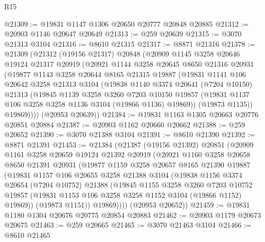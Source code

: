 \begin{lexlean}{R15}
\begin{coremodule}
@21309 := @19831 @1147 @1306 @20650 @20777 @20848 @20885
@21312 := @20903 @1146 @20647 @20649
@21313 := @259 @20639
@21315 := @3070 @21313 @3104
@21316 := @8610 @21315
@21317 := @8871 @21316
@21378 := @21309
    (@21312
      (@19156 @21317)
      @20848
      (@20909
        @1145
        @3258
        @20646
        @19124
        @21317
        @20919
        (@20921
          @1144
          @3258
          @20645
          @8650
          @21316
          @20931
          (@19877
            @1143
            @3258
            @20644
            @8165
            @21315
            @19887
            (@19831
              @1141
              @106
              @20642
              @3258
              @21313
              @3104
              (@19838
                @1140
                @3374
                @20641
                (@7204 @10150)
                @21313
                (@19845
                  @1139
                  @3258
                  @3260
                  @7203
                  @10150
                  @19857
                  (@19831 @1137 @106 @3258 @3258 @1136 @3104 (@19866 @1136) @19869))
                (@19873 @1135))
              @19869))))
      (@20953 @20639))
@21384 := @19831 @1163 @1305 @20663 @20776 @20851 @20884
@21387 := @20903 @1162 @20660 @20662
@21388 := @259 @20652
@21390 := @3070 @21388 @3104
@21391 := @8610 @21390
@21392 := @8871 @21391
@21453 := @21384
    (@21387
      (@19156 @21392)
      @20851
      (@20909
        @1161
        @3258
        @20659
        @19124
        @21392
        @20919
        (@20921
          @1160
          @3258
          @20658
          @8650
          @21391
          @20931
          (@19877
            @1159
            @3258
            @20657
            @8165
            @21390
            @19887
            (@19831
              @1157
              @106
              @20655
              @3258
              @21388
              @3104
              (@19838
                @1156
                @3374
                @20654
                (@7204 @10752)
                @21388
                (@19845
                  @1155
                  @3258
                  @3260
                  @7203
                  @10752
                  @19857
                  (@19831 @1153 @106 @3258 @3258 @1152 @3104 (@19866 @1152) @19869))
                (@19873 @1151))
              @19869))))
      (@20953 @20652))
@21459 := @19831 @1180 @1304 @20676 @20775 @20854 @20883
@21462 := @20903 @1179 @20673 @20675
@21463 := @259 @20665
@21465 := @3070 @21463 @3104
@21466 := @8610 @21465

\end{coremodule}
\end{lexlean}
